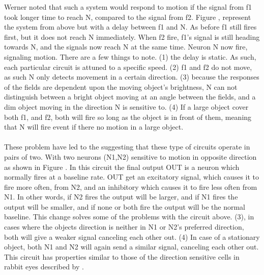 \documentclass[11pt,a4paper,oneside,table,xcdraw]{article}
\begin{document}
Werner \cite{beetle} noted that such a system would respond to motion if the signal from f1 took longer time to reach N, compared to the signal from f2. Figure , represent the system from above but with a delay between f1 and N. As before f1 still fires first, but it does not reach N immediately. When f2 fire, f1's signal is still heading towards N, and the signals now reach N at the same time. Neuron N now fire, signaling motion. There are a few things to note. (1) the delay is static. As such, each particular circuit is attuned to a specific speed. (2) f1 and f2 do not move, as such N only detects movement in a certain direction. (3) because the responses of the fields are dependent upon the moving object's brightness, N can not distinguish between a bright object moving at an angle between the fields, and a dim object moving in the direction N is sensitive to. (4) If a large  object cover both f1, and f2, both will fire so long as the object is in front of them, meaning that N will fire event if there no motion in a large object.
\\\\
These problem have led to the suggesting that these type of circuits operate in pairs of two. With two neurons (N1,N2) sensitive to motion in opposite direction as shown in Figure . In this circuit the final output OUT is a neuron which normally fires at a baseline rate. OUT get an excitatory signal, which causes it to fire more often, from N2, and an inhibitory which causes it to fire less often from N1. In other words, if N2 fires the output will be larger, and if N1 fires the output will be smaller, and if none or both fire the output will be the normal baseline. This change solves some of the problems with the circuit above. (3), in cases where the objects direction is neither in N1 or N2's preferred direction, both will give a weaker signal canceling each other out. (4) In case of a stationary object, both N1 and N2 will again send a similar signal, canceling each other out. This circuit has properties similar to those of the direction sensitive cells in rabbit eyes described by \cite{Barlow1965}.
\end{document}
